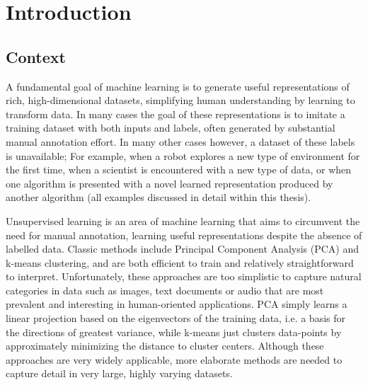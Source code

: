 \chapter{Introduction} \label{ch:intro}

\section{Context} \label{sec:intro-context}
A fundamental goal of machine learning is to generate useful representations of rich, high-dimensional datasets, simplifying human understanding by learning to transform data. In many cases the goal of these representations is to imitate a training dataset with both inputs and labels, often generated by substantial manual annotation effort.
In many other cases however, a dataset of these labels is unavailable; For example, when a robot explores a new type of environment for the first time, when a scientist is encountered with a new type of data, or when one algorithm is presented with a novel learned representation produced by another algorithm (all examples discussed in detail within this thesis).

Unsupervised learning is an area of machine learning that aims to circumvent the need for manual annotation, learning useful representations despite the absence of labelled data. Classic methods include Principal Component Analysis (PCA) and k-means clustering, and are both efficient to train and relatively straightforward to interpret. Unfortunately, these approaches are too simplistic to capture natural categories in data such as images, text documents or audio that are most prevalent and interesting in human-oriented applications. PCA simply learns a linear projection based on the eigenvectors of the training data, i.e. a basis for the directions of greatest variance, while k-means just clusters data-points by approximately minimizing the distance to cluster centers. Although these approaches are very widely applicable, more elaborate methods are needed to capture detail in very large, highly varying datasets.

